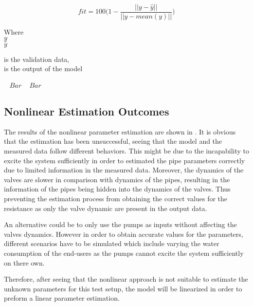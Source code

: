 \begin{equation}
  fit = 100 \bigg(1 - \frac{||y - \hat{y}||}{||y - mean(y)||}\bigg)
  \label{fitequation}
\end{equation} 

\begin{minipage}[t]{0.20\textwidth}
Where\\
\hspace*{8mm} $y$ \\
\hspace*{8mm} $\hat{y}$ \\
\end{minipage}
\begin{minipage}[t]{0.68\textwidth}
\vspace*{2mm}
is the validation data, \\
is the output of the model\\
\end{minipage}
\begin{minipage}[t]{0.10\textwidth}
\vspace*{2mm}
\textcolor{White}{te}$\unit{Bar}$
\textcolor{White}{te}$\unit{Bar}$
\end{minipage}

\subsection{Nonlinear Estimation Outcomes} 
\label{NonLiOutcome}
The results of the nonlinear parameter estimation are shown in . It is obvious that the estimation has been unsuccessful, seeing 
that the model and the measured data follow different behaviors. This might be due to the incapability to excite the system sufficiently in order to estimated the pipe parameters correctly due to limited information in the measured data. Moreover, the dynamics of the valves are slower in comparison with dynamics of the pipes, resulting in the information of the pipes being hidden into the dynamics of the valves. Thus preventing the estimation process from obtaining the correct values for the resistance as only the valve dynamic are present in the output data.

An alternative could be to only use the pumps as inputs without affecting
the valves dynamics. However in order to obtain accurate values for the parameters, different scenarios have to be simulated which include varying the water consumption 
of the end-users as the pumps cannot excite the system sufficiently on there own. 

Therefore, after seeing that the nonlinear approach is not suitable to estimate the unknown parameters for this test setup, the model will be linearized in order to preform a linear parameter estimation.